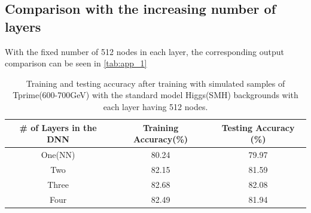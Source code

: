 \begin{appendices}
\chapter{\label{appendix}}
\end{appendices}

\section{Comparison with the increasing number of layers}
With the fixed number of 512 nodes in each layer, the corresponding output comparison can be seen in \autoref{tab:app_1}

\begin{table}[H]
    \centering
    \begin{tabular}{c|c|c} \hline
      \# of Layers in the DNN  & Training Accuracy(\%) &  Testing Accuracy (\%)  \\ \hline \hline
      
       One(NN)        &     80.24   &    79.97  \\
       Two      &  82.15 & 81.59    \\
        Three    & 82.68 & 82.08  \\
        Four &  82.49 & 81.94 \\\hline \hline
    \end{tabular}
    \caption{Training and testing accuracy after training with simulated samples of Tprime(600-700GeV) with the standard model Higgs(SMH) backgrounds with each layer having 512 nodes.}
    \label{tab:app_1}
\end{table}






